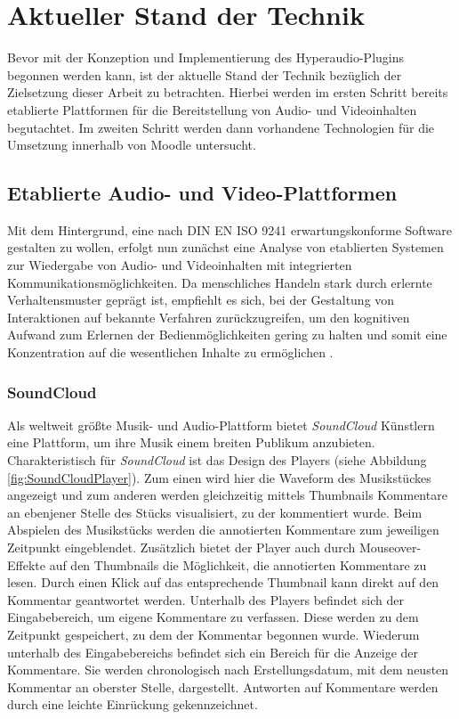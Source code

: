 \section{Aktueller Stand der Technik}
\label{sec:Technik}
Bevor mit der Konzeption und Implementierung des Hyperaudio-Plugins begonnen werden kann, ist der aktuelle Stand der Technik bezüglich der Zielsetzung dieser Arbeit zu betrachten. Hierbei werden im ersten Schritt bereits etablierte Plattformen für die Bereitstellung von Audio- und Videoinhalten begutachtet. Im zweiten Schritt werden dann vorhandene Technologien für die Umsetzung innerhalb von Moodle untersucht.


\subsection{Etablierte Audio- und Video-Plattformen}

Mit dem Hintergrund, eine nach DIN EN ISO 9241 erwartungskonforme Software gestalten zu wollen, erfolgt nun zunächst eine Analyse von etablierten Systemen zur Wiedergabe von Audio- und Videoinhalten mit integrierten Kommunikationsmöglichkeiten. Da menschliches Handeln stark durch erlernte Verhaltensmuster geprägt ist, empfiehlt es sich, bei der Gestaltung von Interaktionen auf bekannte Verfahren zurückzugreifen, um den kognitiven Aufwand zum Erlernen der Bedienmöglichkeiten gering zu halten und somit eine Konzentration auf die wesentlichen Inhalte zu ermöglichen \citep{erwartungskonformitaet}.


\subsubsection{SoundCloud}

\glqq Als weltweit größte Musik- und Audio-Plattform\grqq{} \citep{soundcloudinfo} bietet \textit{SoundCloud} Künstlern eine Plattform, um ihre Musik einem breiten Publikum anzubieten. Charakteristisch für \textit{SoundCloud} ist das Design des Players (siehe Abbildung \ref{fig:SoundCloudPlayer}). Zum einen wird hier die Waveform des Musikstückes angezeigt und zum anderen werden gleichzeitig mittels Thumbnails Kommentare an ebenjener Stelle des Stücks visualisiert, zu der kommentiert wurde. Beim Abspielen des Musikstücks werden die annotierten Kommentare zum jeweiligen Zeitpunkt eingeblendet. Zusätzlich bietet der Player auch durch Mouseover-Effekte auf den Thumbnails die Möglichkeit, die annotierten Kommentare zu lesen. Durch einen Klick auf das entsprechende Thumbnail kann direkt auf den Kommentar geantwortet werden. Unterhalb des Players befindet sich der Eingabebereich, um eigene Kommentare zu verfassen. Diese werden zu dem Zeitpunkt gespeichert, zu dem der Kommentar begonnen wurde. Wiederum unterhalb des Eingabebereichs befindet sich ein Bereich für die Anzeige der Kommentare. Sie werden chronologisch nach Erstellungsdatum, mit dem neusten Kommentar an oberster Stelle, dargestellt. Antworten auf Kommentare werden durch eine leichte Einrückung gekennzeichnet.

